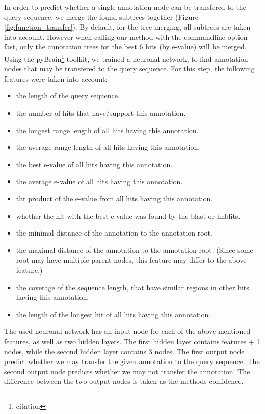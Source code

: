 In order to predict whether a single annotation node can be transfered to the query sequence, we merge the found subtrees together (Figure \ref{fig:function_transfer}). By default, for the tree merging,
all subtrees are taken into account. However when calling our method with the commandline option --fast, only the annotation trees for the best 6 hits (by e-value) will be merged.\newline
Using the pyBrain\footnote{citation} toolkit, we trained a neuronal network, to find annotation nodes that may be transfered to the query sequence. For this step, the following features were taken into
account:
\begin{itemize}
\item the length of the query sequence.
\item the number of hits that have/support this annotation.
\item the longest range length of all hits having this annotation.
\item the average range length of all hits having this annotation.
\item the best e-value of all hits having this annotation.
\item the average e-value of all hits having this annotation.
\item thr product of the e-value from all hits having this annotation.
\item whether the hit with the best e-value was found by the blast or hhblits.
\item the minimal distance of the annotation to the annotation root.
\item the maximal distance of the annotation to the annotation root. (Since some root may have multiple parent nodes, this feature may differ to the above feature.)
\item the coverage of the sequence length, that have similar regions in other hits having this annotation.
\item the length of the longest hit of all hits having this annotation.
\end{itemize}
The used neuronal network has an input node for each of the above mentioned features, as well as two hidden layers. The first hidden layer contains features + 1 nodes, while the second hidden layer
contains 3 nodes. The first output node predict whether we may transfer the given annotation to the query sequence. The second output node predicts whether we may not transfer the annotation.
The difference between the two output nodes is taken as the methods confidence.
